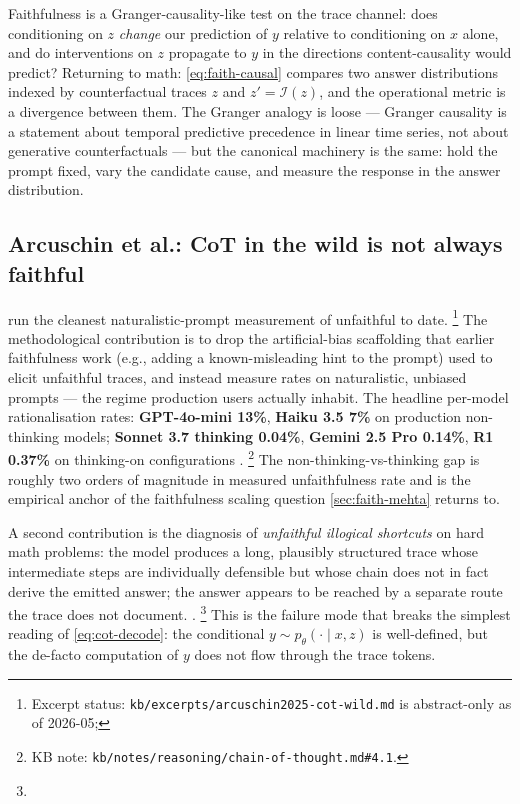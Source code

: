 \begin{intuition}
Faithfulness is a Granger-causality-like test on the trace channel:
does conditioning on $z$ \emph{change} our prediction of $y$ relative
to conditioning on $x$ alone, and do interventions on $z$ propagate
to $y$ in the directions content-causality would predict? Returning
to math: \cref{eq:faith-causal} compares two answer distributions
indexed by counterfactual traces $z$ and $z' = \mathcal{I}(z)$, and
the operational metric is a divergence between them. The Granger
analogy is loose — Granger causality is a statement about temporal
predictive precedence in linear time series, not about generative
counterfactuals — but the canonical machinery is the same: hold the
prompt fixed, vary the candidate cause, and measure the response in
the answer distribution.
\end{intuition}

\subsection{Arcuschin et al.: CoT in the wild is not always faithful}
\label{sec:faith-arcuschin}

\citet{arcuschin2025-cot-wild} run the cleanest naturalistic-prompt
measurement of unfaithful  to date.%
\footnote{Excerpt status:
\nolinkurl{kb/excerpts/arcuschin2025-cot-wild.md} is abstract-only as of
2026-05; } The methodological contribution is to drop the
artificial-bias scaffolding that earlier faithfulness work
(e.g., adding a known-misleading hint to the prompt) used to elicit
unfaithful traces, and instead measure rates on naturalistic, unbiased
prompts — the regime production users actually inhabit. The headline
per-model rationalisation rates: \textbf{GPT-4o-mini 13\%},
\textbf{Haiku 3.5 7\%} on production non-thinking models;
\textbf{Sonnet 3.7 thinking 0.04\%}, \textbf{Gemini 2.5 Pro 0.14\%},
\textbf{R1 0.37\%} on thinking-on configurations
\citep[abstract]{arcuschin2025-cot-wild}.%
\footnote{KB note:
\nolinkurl{kb/notes/reasoning/chain-of-thought.md#4.1}.} The
non-thinking-vs-thinking gap is roughly two orders of magnitude in
measured unfaithfulness rate and is the empirical anchor of the
faithfulness scaling question \cref{sec:faith-mehta} returns to.

A second contribution is the diagnosis of \emph{unfaithful illogical
shortcuts} on hard math problems: the model produces a long, plausibly
structured trace whose intermediate steps are individually defensible
but whose chain does not in fact derive the emitted answer; the answer
appears to be reached by a separate route the trace does not document.
\citep[\S 4]{arcuschin2025-cot-wild}.%
\footnote{}
This is the failure mode that breaks the simplest reading of
\cref{eq:cot-decode}: the conditional $y \sim p_\theta(\cdot \mid x,
z)$ is well-defined, but the de-facto computation of $y$ does not
flow through the trace tokens.

